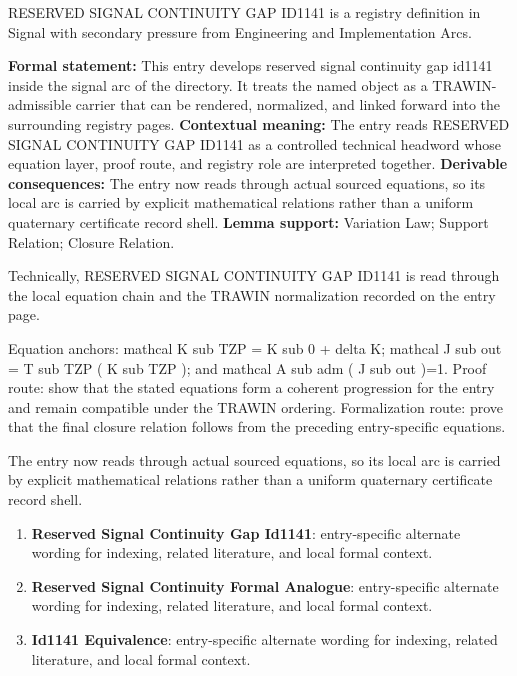 
\begingroup\small
{}
RESERVED SIGNAL CONTINUITY GAP ID1141 is a registry definition in Signal with secondary pressure from Engineering and Implementation Arcs.

\begingroup\footnotesize\setlength{\emergencystretch}{3em}\sloppy
\textbf{Formal statement:} This entry develops reserved signal continuity gap id1141 inside the signal arc of the directory. It treats the named object as a TRAWIN-admissible carrier that can be rendered, normalized, and linked forward into the surrounding registry pages. \textbf{Contextual meaning:} The entry reads RESERVED SIGNAL CONTINUITY GAP ID1141 as a controlled technical headword whose equation layer, proof route, and registry role are interpreted together. \textbf{Derivable consequences:} The entry now reads through actual sourced equations, so its local arc is carried by explicit mathematical relations rather than a uniform quaternary certificate record shell. \textbf{Lemma support:} Variation Law; Support Relation; Closure Relation.\par
\endgroup

Technically, RESERVED SIGNAL CONTINUITY GAP ID1141 is read through the local equation chain and the TRAWIN normalization recorded on the entry page.

Equation anchors: mathcal K sub TZP = K sub 0 + delta K; mathcal J sub out = T sub TZP ( K sub TZP ); and mathcal A sub adm ( J sub out )=1. Proof route: show that the stated equations form a coherent progression for the entry and remain compatible under the TRAWIN ordering. Formalization route: prove that the final closure relation follows from the preceding entry-specific equations.

The entry now reads through actual sourced equations, so its local arc is carried by explicit mathematical relations rather than a uniform quaternary certificate record shell.
\endgroup

\begin{enumerate}[leftmargin=1.6em,itemsep=6pt,topsep=4pt]
\item \textbf{Reserved Signal Continuity Gap Id1141}: entry-specific alternate wording for indexing, related literature, and local formal context.
\item \textbf{Reserved Signal Continuity Formal Analogue}: entry-specific alternate wording for indexing, related literature, and local formal context.
\item \textbf{Id1141 Equivalence}: entry-specific alternate wording for indexing, related literature, and local formal context.
\end{enumerate}

